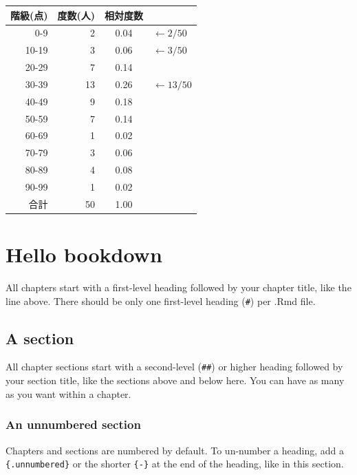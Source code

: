 \documentclass[
]{book}
\theoremstyle{definition}
\theoremstyle{definition}
\theoremstyle{definition}
\theoremstyle{definition}
\theoremstyle{remark}
\begin{document}
\begin{longtable}[]{@{}rrcl@{}}
\toprule()
階級(点) & 度数(人) & 相対度数 & \\
\midrule()
\endhead
0-9 & 2 & 0.04 & \(\leftarrow 2/50\) \\
10-19 & 3 & 0.06 & \(\leftarrow 3/50\) \\
20-29 & 7 & 0.14 & \\
30-39 & 13 & 0.26 & \(\leftarrow 13/50\) \\
40-49 & 9 & 0.18 & \\
50-59 & 7 & 0.14 & \\
60-69 & 1 & 0.02 & \\
70-79 & 3 & 0.06 & \\
80-89 & 4 & 0.08 & \\
90-99 & 1 & 0.02 & \\
合計 & 50 & 1.00 & \\
\bottomrule()
\end{longtable}

\hypertarget{hello-bookdown}{%
\chapter{Hello bookdown}\label{hello-bookdown}}

All chapters start with a first-level heading followed by your chapter title, like the line above. There should be only one first-level heading (\texttt{\#}) per .Rmd file.

\hypertarget{a-section}{%
\section{A section}\label{a-section}}

All chapter sections start with a second-level (\texttt{\#\#}) or higher heading followed by your section title, like the sections above and below here. You can have as many as you want within a chapter.

\hypertarget{an-unnumbered-section}{%
\subsection*{An unnumbered section}\label{an-unnumbered-section}}

Chapters and sections are numbered by default. To un-number a heading, add a \texttt{\{.unnumbered\}} or the shorter \texttt{\{-\}} at the end of the heading, like in this section.
\end{document}
